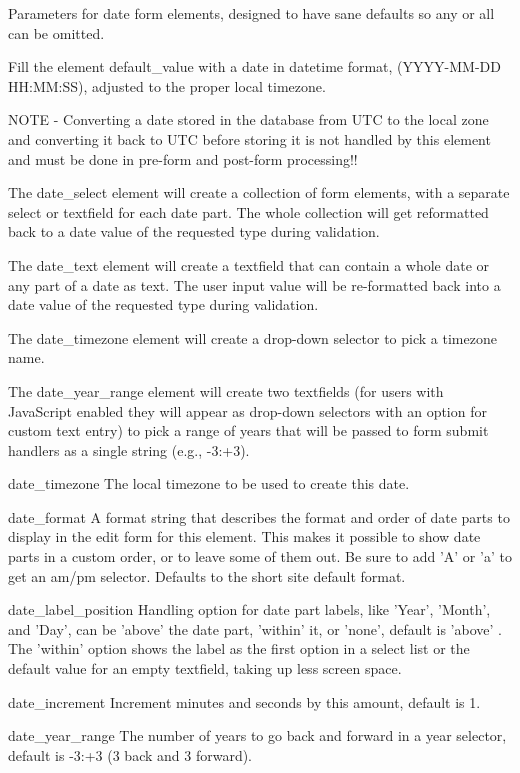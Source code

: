 Parameters for date form elements, designed to have sane defaults so any or all can be omitted.

Fill the element default\_\-value with a date in datetime format, (YYYY-\/MM-\/DD HH:MM:SS), adjusted to the proper local timezone.

NOTE -\/ Converting a date stored in the database from UTC to the local zone and converting it back to UTC before storing it is not handled by this element and must be done in pre-\/form and post-\/form processing!!

The date\_\-select element will create a collection of form elements, with a separate select or textfield for each date part. The whole collection will get reformatted back to a date value of the requested type during validation.

The date\_\-text element will create a textfield that can contain a whole date or any part of a date as text. The user input value will be re-\/formatted back into a date value of the requested type during validation.

The date\_\-timezone element will create a drop-\/down selector to pick a timezone name.

The date\_\-year\_\-range element will create two textfields (for users with JavaScript enabled they will appear as drop-\/down selectors with an option for custom text entry) to pick a range of years that will be passed to form submit handlers as a single string (e.g., -\/3:+3).

date\_\-timezone The local timezone to be used to create this date.

date\_\-format A format string that describes the format and order of date parts to display in the edit form for this element. This makes it possible to show date parts in a custom order, or to leave some of them out. Be sure to add 'A' or 'a' to get an am/pm selector. Defaults to the short site default format.

date\_\-label\_\-position Handling option for date part labels, like 'Year', 'Month', and 'Day', can be 'above' the date part, 'within' it, or 'none', default is 'above' . The 'within' option shows the label as the first option in a select list or the default value for an empty textfield, taking up less screen space.

date\_\-increment Increment minutes and seconds by this amount, default is 1.

date\_\-year\_\-range The number of years to go back and forward in a year selector, default is -\/3:+3 (3 back and 3 forward).

